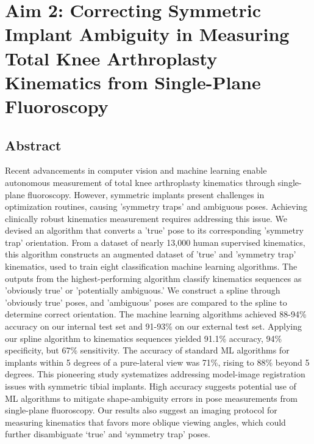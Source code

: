 \chapter{Aim 2: Correcting Symmetric Implant Ambiguity in Measuring Total Knee Arthroplasty Kinematics from Single-Plane Fluoroscopy}

\section{Abstract}
Recent advancements in computer vision and machine learning enable autonomous measurement of total knee arthroplasty kinematics through single-plane fluoroscopy.
However, symmetric implants present challenges in optimization routines, causing 'symmetry traps' and ambiguous poses.
Achieving clinically robust kinematics measurement requires addressing this issue. We devised an algorithm that converts a 'true' pose to its corresponding 'symmetry trap' orientation.
From a dataset of nearly 13,000 human supervised kinematics, this algorithm constructs an augmented dataset of 'true' and 'symmetry trap' kinematics, used to train eight classification machine learning algorithms.
The outputs from the highest-performing algorithm classify kinematics sequences as 'obviously true' or 'potentially ambiguous.'
We construct a spline through 'obviously true' poses, and 'ambiguous' poses are compared to the spline to determine correct orientation.
The machine learning algorithms achieved 88-94\% accuracy on our internal test set and 91-93\% on our external test set.
Applying our spline algorithm to kinematics sequences yielded 91.1\% accuracy, 94\% specificity, but 67\% sensitivity.
The accuracy of standard ML algorithms for implants within 5 degrees of a pure-lateral view was 71\%, rising to 88\% beyond 5 degrees.
This pioneering study systematizes addressing model-image registration issues with symmetric tibial implants.
High accuracy suggests potential use of ML algorithms to mitigate shape-ambiguity errors in pose measurements from single-plane fluoroscopy.
Our results also suggest an imaging protocol for measuring kinematics that favors more oblique viewing angles, which could further disambiguate ‘true’ and ‘symmetry trap’ poses.


